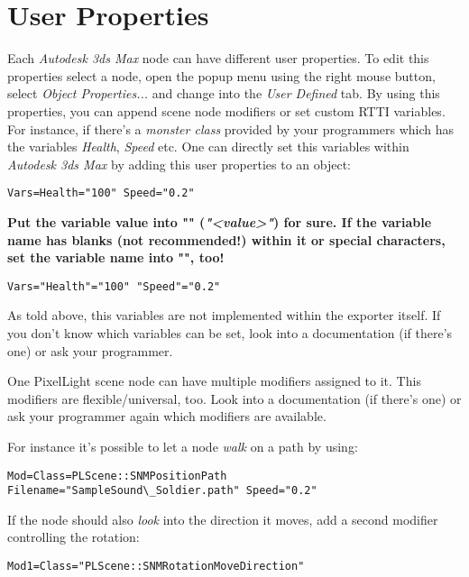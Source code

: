 \chapter{User Properties}
Each \emph{Autodesk 3ds Max} node can have different user properties. To edit this properties select a node, open the popup menu using the right mouse button, select \emph{Object Properties...} and change into the \emph{User Defined} tab. By using this properties, you can append scene node modifiers or set custom RTTI variables. For instance, if there's a \emph{monster class} provided by your programmers which has the variables \emph{Health}, \emph{Speed} etc. One can directly set this variables within \emph{Autodesk 3ds Max} by adding this user properties to an object:

\begin{lstlisting}[caption=Setting scene node variables]
Vars=Health="100" Speed="0.2"
\end{lstlisting}

\textbf{Put the variable value into "" (\emph{"<value>"}) for sure. If the variable name has blanks (not recommended!) within it or special characters, set the variable name into "", too!}

\begin{lstlisting}[caption=Setting scene node variables safely]
Vars="Health"="100" "Speed"="0.2"
\end{lstlisting}

As told above, this variables are not implemented within the exporter itself. If you don't know which variables can be set, look into a documentation (if there's one) or ask your programmer.

One PixelLight scene node can have multiple modifiers assigned to it. This modifiers are flexible/universal, too. Look into a documentation (if there's one) or ask your programmer again which modifiers are available.

For instance it's possible to let a node \emph{walk} on a path by using:

\begin{lstlisting}[caption=Path scene node modifier]
Mod=Class=PLScene::SNMPositionPath Filename="SampleSound\_Soldier.path" Speed="0.2"
\end{lstlisting}

If the node should also \emph{look} into the direction it moves, add a second modifier controlling the rotation:

\begin{lstlisting}[caption=Look into movement direction scene node modifier]
Mod1=Class="PLScene::SNMRotationMoveDirection"
\end{lstlisting}

